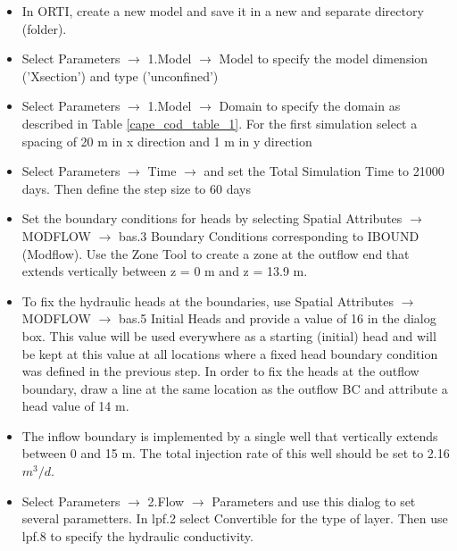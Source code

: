 \begin{itemize}

\item In ORTI, create a new model and save it in a new and separate directory (folder).

\item Select {\color{blue}Parameters} $\rightarrow$ {\color{blue}1.Model} 
$\rightarrow$ {\color{blue}Model} to specify the model dimension {\color{blue}('Xsection')}
and type {\color{blue}('unconfined')}

\item Select {\color{blue}Parameters} $\rightarrow$ 
{\color{blue}1.Model} $\rightarrow$ 
{\color{blue}Domain} to specify the domain as described in Table 
\ref{cape_cod_table_1}. 
For the first simulation select a spacing of 20 m in 
x direction and 1 m in y direction

\item Select {\color{blue}Parameters} $\rightarrow$ {\color{blue}Time} 
$\rightarrow$ and set the {\color{blue}Total Simulation Time} 
to 21000 days. Then define the step size to 60 days

\item Set the boundary conditions for heads by selecting 
{\color{blue}Spatial Attributes} $\rightarrow$ {\color{blue}MODFLOW} 
$\rightarrow$ {\color{blue}bas.3 Boundary Conditions} corresponding to
IBOUND (Modflow). 
Use the {\color{blue}Zone Tool} to create a zone at the 
outflow end that extends vertically between z = 0 m and z = 13.9 m.

\item To fix the hydraulic heads at the boundaries, use 
{\color{blue}Spatial Attributes} $\rightarrow$ 
{\color{blue}MODFLOW} $\rightarrow$ {\color{blue}bas.5 Initial Heads} and provide 
a value of 16 in the dialog box. This value will be used everywhere as a 
starting (initial) head and will be kept at this value at all locations
where a fixed head boundary condition was defined in the previous step. 
In order to fix the heads at the outflow boundary, 
draw a line at the same location as the outflow BC 
and attribute a head value of 14 m.

\item The inflow boundary is implemented by a single well that vertically extends 
between 0 and 15 m. The total injection rate of this well should be set to 2.16 $m^3/d$.

\item Select {\color{blue}Parameters} $\rightarrow$ {\color{blue}2.Flow} 
$\rightarrow$ {\color{blue}Parameters} 
and use this dialog to set several parametters. 
In {\color{blue}lpf.2} select {\color{blue}Convertible} 
for the {\color{blue}type of layer}. 
Then use {\color{blue}lpf.8} to specify the hydraulic conductivity.


\end{itemize}
